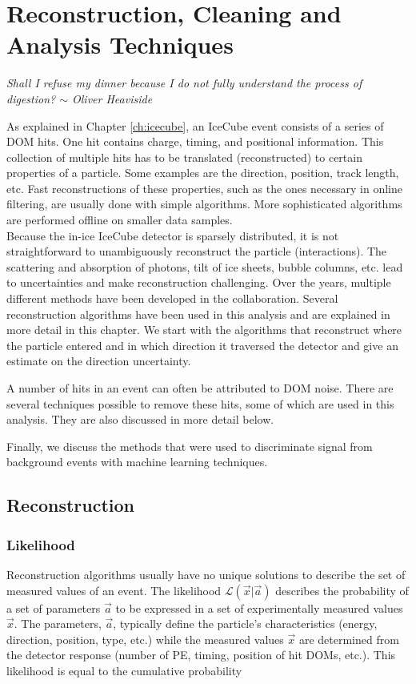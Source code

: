 \chapter{Reconstruction, Cleaning and Analysis Techniques}
\label{ch:reconstruction}
\begin{flushright}
\textit{Shall I refuse my dinner because I do not fully understand the process of digestion? $\sim$ Oliver Heaviside}
\end{flushright}
As explained in Chapter \ref{ch:icecube}, an IceCube event consists of a series of DOM hits. One hit contains charge, timing, and positional information. This collection of multiple hits has to be translated (reconstructed) to certain properties of a particle. Some examples are the direction, position, track length, etc. Fast reconstructions of these properties, such as the ones necessary in online filtering, are usually done with simple algorithms. More sophisticated algorithms are performed offline on smaller data samples.\\

\noindent Because the in-ice IceCube detector is sparsely distributed, it is not straightforward to unambiguously reconstruct the particle (interactions). The scattering and absorption of photons, tilt of ice sheets, bubble columns, etc. lead to uncertainties and make reconstruction challenging. Over the years, multiple different methods have been developed in the collaboration. Several reconstruction algorithms have been used in this analysis and are explained in more detail in this chapter. We start with the algorithms that reconstruct where the particle entered and in which direction it traversed the detector and give an estimate on the direction uncertainty.

A number of hits in an event can often be attributed to DOM noise. There are several techniques possible to remove these hits, some of which are used in this analysis. They are also discussed in more detail below.

Finally, we discuss the methods that were used to discriminate signal from background events with machine learning techniques.

\section{Reconstruction}

\subsection{Likelihood}
Reconstruction algorithms usually have no unique solutions to describe the set of measured values of an event. The likelihood $\mathcal{L}(\vec{x} |\vec{a})$ describes the probability of a set of parameters ${\vec{a}}$ to be expressed in a set of experimentally measured values ${\vec{x}}$. The parameters, ${\vec{a}}$, typically define the particle's characteristics (energy, direction, position, type, etc.) while the measured values ${\vec{x}}$ are determined from the detector response (number of PE, timing, position of hit DOMs, etc.). This likelihood is equal to the cumulative probability

